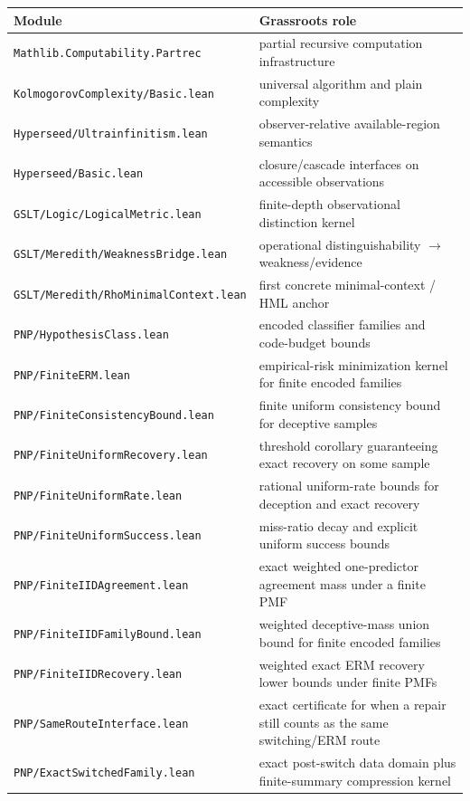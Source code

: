 \documentclass[11pt]{article}
\theoremstyle{remark}
\begin{document}
\begin{center}
\begin{tabular}{ll}
\toprule
\textbf{Module} & \textbf{Grassroots role} \\
\midrule
\texttt{Mathlib.Computability.Partrec} & partial recursive computation infrastructure \\
\texttt{KolmogorovComplexity/Basic.lean} & universal algorithm and plain complexity \\
\texttt{Hyperseed/Ultrainfinitism.lean} & observer-relative available-region semantics \\
\texttt{Hyperseed/Basic.lean} & closure/cascade interfaces on accessible observations \\
\texttt{GSLT/Logic/LogicalMetric.lean} & finite-depth observational distinction kernel \\
\texttt{GSLT/Meredith/WeaknessBridge.lean} & operational distinguishability $\to$ weakness/evidence \\
\texttt{GSLT/Meredith/RhoMinimalContext.lean} & first concrete minimal-context / HML anchor \\
\texttt{PNP/HypothesisClass.lean} & encoded classifier families and code-budget bounds \\
\texttt{PNP/FiniteERM.lean} & empirical-risk minimization kernel for finite encoded families \\
\texttt{PNP/FiniteConsistencyBound.lean} & finite uniform consistency bound for deceptive samples \\
\texttt{PNP/FiniteUniformRecovery.lean} & threshold corollary guaranteeing exact recovery on some sample \\
\texttt{PNP/FiniteUniformRate.lean} & rational uniform-rate bounds for deception and exact recovery \\
\texttt{PNP/FiniteUniformSuccess.lean} & miss-ratio decay and explicit uniform success bounds \\
\texttt{PNP/FiniteIIDAgreement.lean} & exact weighted one-predictor agreement mass under a finite PMF \\
\texttt{PNP/FiniteIIDFamilyBound.lean} & weighted deceptive-mass union bound for finite encoded families \\
\texttt{PNP/FiniteIIDRecovery.lean} & weighted exact ERM recovery lower bounds under finite PMFs \\
\texttt{PNP/SameRouteInterface.lean} & exact certificate for when a repair still counts as the same switching/ERM route \\
\texttt{PNP/ExactSwitchedFamily.lean} & exact post-switch data domain plus finite-summary compression kernel \\

\end{tabular}
\end{center}
\end{document}
